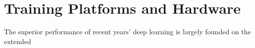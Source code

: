 \section{Training Platforms and Hardware}
The superior performance of recent years' deep learning is largely founded on the extended 
